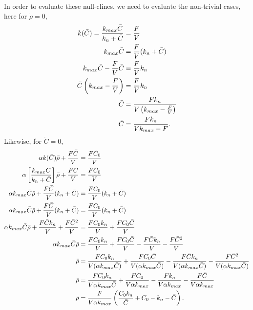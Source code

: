 In order to evaluate these null-clines, we need to evaluate the non-trivial cases, here for $\dot{\rho} = 0$,
\begin{align}
  k(\bar{C}) = \frac{k_{max} \bar{C}}{k_n + \bar{C}} &= \frac{F}{V} \notag \\
  k_{max} \bar{C} &= \frac{F}{V} (k_n + \bar{C}) \notag \\
  k_{max} \bar{C} - \frac{F}{V}\bar{C} &= \frac{F}{V} k_n \notag \\
  \bar{C} \left( k_{max} - \frac{F}{V} \right) &= \frac{F}{V} k_n \notag \\
  \bar{C} &= \frac{F k_n}{V \left( k_{max} - \frac{F}{V}\right)} \notag \\
  \bar{C} &= \frac{F k_n}{V k_{max} - F}.
\end{align}
Likewise, for $\dot{C} = 0$,
\begin{align}
  \alpha k(\bar{C}) \bar{\rho} + \frac{F\bar{C}}{V} &= \frac{FC_0}{V} \notag \\
  \alpha \left[ \frac{k_{max}\bar{C}}{k_n + \bar{C}} \right] \bar{\rho} + \frac{F\bar{C}}{V} &= \frac{FC_0}{V} \notag \\
  \alpha k_{max}\bar{C} \bar{\rho} + \frac{F\bar{C}}{V} (k_n + \bar{C}) &= \frac{FC_0}{V} (k_n + \bar{C}) \notag \\
  \alpha k_{max}\bar{C} \bar{\rho} + \frac{F\bar{C}}{V} (k_n + \bar{C}) &= \frac{FC_0}{V} (k_n + \bar{C}) \notag \\
  \alpha k_{max}\bar{C} \bar{\rho} + \frac{F\bar{C} k_n}{V} + \frac{F\bar{C}^2}{V}  &= \frac{FC_0 k_n}{V} + \frac{FC_0 \bar{C}}{V} \notag \\
  \alpha k_{max}\bar{C} \bar{\rho} &= \frac{FC_0 k_n}{V} + \frac{FC_0 \bar{C}}{V} - \frac{F\bar{C} k_n}{V} - \frac{F\bar{C}^2}{V} \notag \\
  \bar{\rho} &= \frac{FC_0 k_n}{V(\alpha k_{max} \bar{C})} + \frac{FC_0 \bar{C}}{V(\alpha k_{max} \bar{C})} - \frac{F\bar{C} k_n}{V(\alpha k_{max} \bar{C})} - \frac{F\bar{C}^2}{V(\alpha k_{max} \bar{C})} \notag \\
  \bar{\rho} &= \frac{FC_0 k_n}{V \alpha k_{max} \bar{C}} + \frac{FC_0}{V \alpha k_{max}} - \frac{F k_n}{V \alpha k_{max}} - \frac{F\bar{C}}{V \alpha k_{max}} \notag \\
  \bar{\rho} &= \frac{F}{V \alpha k_{max}} \left( \frac{C_0 k_n}{\bar{C}} + C_0 - k_n - \bar{C} \right). 
\end{align}

\newpage

